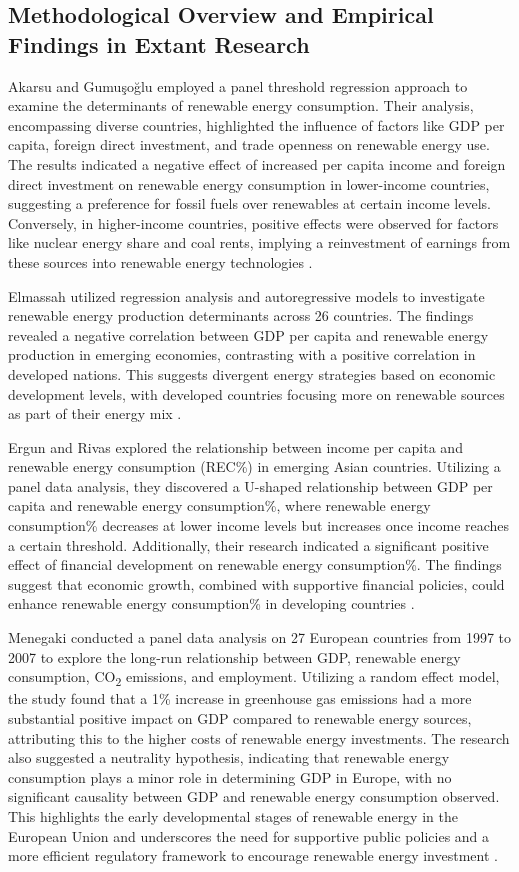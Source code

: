 \documentclass[a4paper,11pt]{article}
\begin{document}
\subsection{Methodological Overview and Empirical Findings in Extant Research}
Akarsu and Gumu\c{s}o\u{g}lu employed a panel threshold regression approach to examine the determinants of renewable energy consumption. Their analysis, encompassing diverse countries, highlighted the influence of factors like GDP per capita, foreign direct investment, and trade openness on renewable energy use. The results indicated a negative effect of increased per capita income and foreign direct investment on renewable energy consumption in lower-income countries, suggesting a preference for fossil fuels over renewables at certain income levels. Conversely, in higher-income countries, positive effects were observed for factors like nuclear energy share and coal rents, implying a reinvestment of earnings from these sources into renewable energy technologies \textcite{ref3}.

Elmassah utilized regression analysis and autoregressive models to investigate renewable energy production determinants across 26 countries. The findings revealed a negative correlation between GDP per capita and renewable energy production in emerging economies, contrasting with a positive correlation in developed nations. This suggests divergent energy strategies based on economic development levels, with developed countries focusing more on renewable sources as part of their energy mix \textcite{ref19}.

Ergun and Rivas explored the relationship between income per capita and renewable energy consumption (REC\%) in emerging Asian countries. Utilizing a panel data analysis, they discovered a U-shaped relationship between GDP per capita and renewable energy consumption\%, where renewable energy consumption\% decreases at lower income levels but increases once income reaches a certain threshold. Additionally, their research indicated a significant positive effect of financial development on renewable energy consumption\%. The findings suggest that economic growth, combined with supportive financial policies, could enhance renewable energy consumption\% in developing countries \textcite{ref21}.

Menegaki conducted a panel data analysis on 27 European countries from 1997 to 2007 to explore the long-run relationship between GDP, renewable energy consumption, CO\textsubscript{2} emissions, and employment. Utilizing a random effect model, the study found that a 1\% increase in greenhouse gas emissions had a more substantial positive impact on GDP compared to renewable energy sources, attributing this to the higher costs of renewable energy investments. The research also suggested a neutrality hypothesis, indicating that renewable energy consumption plays a minor role in determining GDP in Europe, with no significant causality between GDP and renewable energy consumption observed. This highlights the early developmental stages of renewable energy in the European Union and underscores the need for supportive public policies and a more efficient regulatory framework to encourage renewable energy investment \textcite{ref36}.
\end{document}
